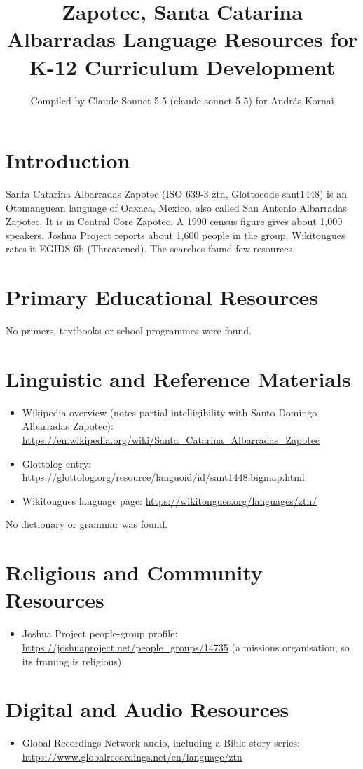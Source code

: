 \documentclass[12pt]{article}
\title{Zapotec, Santa Catarina Albarradas Language Resources for K-12 Curriculum Development}
\author{Compiled by Claude Sonnet 5.5 (claude-sonnet-5-5) for Andr\'as Kornai}
\date{}
\begin{document}
\maketitle

\section{Introduction}
Santa Catarina Albarradas Zapotec (ISO 639-3 ztn, Glottocode sant1448) is an Otomanguean language of Oaxaca, Mexico, also called San Antonio Albarradas Zapotec. It is in Central Core Zapotec. A 1990 census figure gives about 1,000 speakers. Joshua Project reports about 1,600 people in the group. Wikitongues rates it EGIDS 6b (Threatened). The searches found few resources.

\section{Primary Educational Resources}
No primers, textbooks or school programmes were found.

\section{Linguistic and Reference Materials}
\begin{itemize}
\item Wikipedia overview (notes partial intelligibility with Santo Domingo Albarradas Zapotec): \url{https://en.wikipedia.org/wiki/Santa_Catarina_Albarradas_Zapotec}
\item Glottolog entry: \url{https://glottolog.org/resource/languoid/id/sant1448.bigmap.html}
\item Wikitongues language page: \url{https://wikitongues.org/languages/ztn/}
\end{itemize}
No dictionary or grammar was found.

\section{Religious and Community Resources}
\begin{itemize}
\item Joshua Project people-group profile: \url{https://joshuaproject.net/people_groups/14735} (a missions organisation, so its framing is religious)
\end{itemize}

\section{Digital and Audio Resources}
\begin{itemize}
\item Global Recordings Network audio, including a Bible-story series: \url{https://www.globalrecordings.net/en/language/ztn}
\end{itemize}
\end{document}
